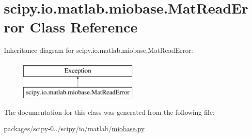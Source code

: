 \hypertarget{classscipy_1_1io_1_1matlab_1_1miobase_1_1MatReadError}{}\section{scipy.\+io.\+matlab.\+miobase.\+Mat\+Read\+Error Class Reference}
\label{classscipy_1_1io_1_1matlab_1_1miobase_1_1MatReadError}
Inheritance diagram for scipy.\+io.\+matlab.\+miobase.\+Mat\+Read\+Error\+:\begin{figure}[H]
\begin{center}
\leavevmode
\includegraphics[height=2.000000cm]{classscipy_1_1io_1_1matlab_1_1miobase_1_1MatReadError}
\end{center}
\end{figure}


The documentation for this class was generated from the following file\+:\begin{DoxyCompactItemize}
\item 
packages/scipy-\/0../scipy/io/matlab/\hyperlink{miobase_8py}{miobase.\+py}\end{DoxyCompactItemize}
